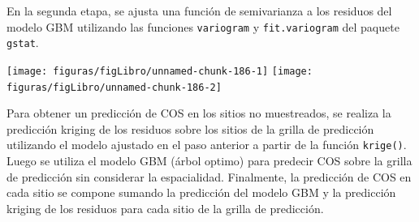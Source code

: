 \documentclass[11pt,b5paper,]{krantz}
\newenvironment{Shaded}{}{}
\newcommand{\DataTypeTok}[1]{\textcolor[rgb]{0.56,0.13,0.00}{#1}}
\newcommand{\DecValTok}[1]{\textcolor[rgb]{0.25,0.63,0.44}{#1}}
\newcommand{\KeywordTok}[1]{\textcolor[rgb]{0.00,0.44,0.13}{\textbf{#1}}}
\newcommand{\NormalTok}[1]{#1}
\newcommand{\OperatorTok}[1]{\textcolor[rgb]{0.40,0.40,0.40}{#1}}
\newcommand{\StringTok}[1]{\textcolor[rgb]{0.25,0.44,0.63}{#1}}
\begin{document}
En la segunda etapa, se ajusta una función de semivarianza a los residuos del modelo GBM utilizando las funciones \texttt{variogram} y \texttt{fit.variogram} del paquete \texttt{gstat}.

\begin{Shaded}
\end{Shaded}

\begin{center}\texttt{[image: figuras/figLibro/unnamed-chunk-186-1]} \texttt{[image: figuras/figLibro/unnamed-chunk-186-2]} \end{center}

Para obtener un predicción de COS en los sitios no muestreados, se realiza la predicción kriging de los residuos sobre los sitios de la grilla de predicción utilizando el modelo ajustado en el paso anterior a partir de la función \texttt{krige()}. Luego se utiliza el modelo GBM (árbol optimo) para predecir COS sobre la grilla de predicción sin considerar la espacialidad. Finalmente, la predicción de COS en cada sitio se compone sumando la predicción del modelo GBM y la predicción kriging de los residuos para cada sitio de la grilla de predicción.
\end{document}
